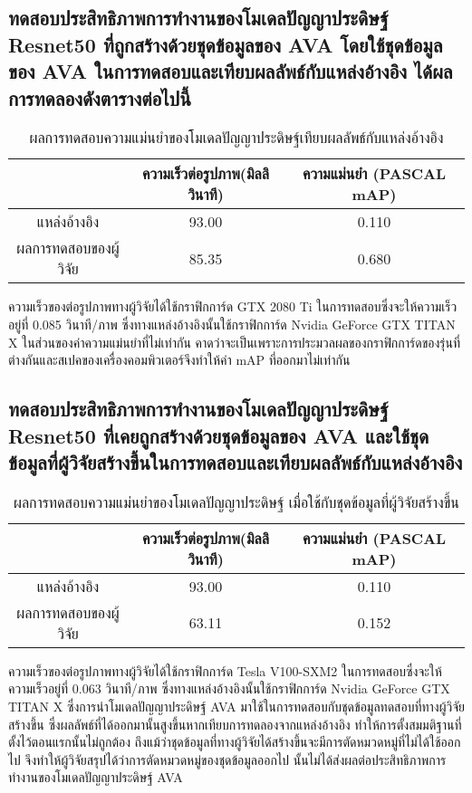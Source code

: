 \subsection{ทดสอบประสิทธิภาพการทำงานของโมเดลปัญญาประดิษฐ์ Resnet50 ที่ถูกสร้างด้วยชุดข้อมูลของ AVA โดยใช้ชุดข้อมูลของ AVA ในการทดสอบและเทียบผลลัพธ์กับแหล่งอ้างอิง ได้ผลการทดลองดังตารางต่อไปนี้}
\begin{table}[!ht]
	\centering
	\begin{tabular}{|c|c|c|}
			\hline
			{}&{ความเร็วต่อรูปภาพ(มิลลิวินาที)}&{ความแม่นยำ (PASCAL mAP)}			\\
			\hline
			แหล่งอ้างอิง	 					& 93.00		& 0.110				\\
			ผลการทดสอบของผู้วิจัย				& 85.35  	& 0.680				\\
			\hline
	\end{tabular}
\caption{ผลการทดสอบความแม่นยำของโมเดลปัญญาประดิษฐ์เทียบผลลัพธ์กับแหล่งอ้างอิง}
\label{tab: Compare PASCAL mAP with source}
\end{table}
ความเร็วของต่อรูปภาพทางผู้วิจัยได้ใช้กราฟิกการ์ด GTX 2080 Ti ในการทดสอบซึ่งจะให้ความเร็วอยู่ที่ 0.085 วินาที/ภาพ ซึ่งทางแหล่งอ้างอิงนั้นใช้กราฟิกการ์ด Nvidia GeForce GTX TITAN X 
ในส่วนของค่าความแม่นยำที่ไม่เท่ากัน คาดว่าจะเป็นเพราะการประมวลผลของกราฟิกการ์ดของรุ่นที่ต่างกันและสเปคของเครื่องคอมพิวเตอร์จึงทำให้ค่า mAP ที่ออกมาไม่เท่ากัน

\subsection{ทดสอบประสิทธิภาพการทำงานของโมเดลปัญญาประดิษฐ์ Resnet50 ที่เคยถูกสร้างด้วยชุดข้อมูลของ AVA และใช้ชุดข้อมูลที่ผู้วิจัยสร้างขึ้นในการทดสอบและเทียบผลลัพธ์กับแหล่งอ้างอิง}
\begin{table}[!ht]
	\centering
	\begin{tabular}{|c|c|c|}
			\hline
			{}&{ความเร็วต่อรูปภาพ(มิลลิวินาที)}&{ความแม่นยำ (PASCAL mAP)}			\\
			\hline
			แหล่งอ้างอิง	 					& 93.00			& 0.110			\\
			ผลการทดสอบของผู้วิจัย				& 63.11			& 0.152			\\
			\hline
	\end{tabular}
\caption{ผลการทดสอบความแม่นยำของโมเดลปัญญาประดิษฐ์ เมื่อใช้กับชุดข้อมูลที่ผู้วิจัยสร้างขึ้น}
\label{tab: Compare PASCAL mAP with dataset created by the researcher}
\end{table}
ความเร็วของต่อรูปภาพทางผู้วิจัยได้ใช้กราฟิกการ์ด Tesla V100-SXM2 ในการทดสอบซึ่งจะให้ความเร็วอยู่ที่ 0.063 วินาที/ภาพ ซึ่งทางแหล่งอ้างอิงนั้นใช้กราฟิกการ์ด Nvidia GeForce GTX TITAN X ซึ่งการนำโมเดลปัญญาประดิษฐ์ AVA มาใช้ในการทดสอบกับชุดข้อมูลทดสอบที่ทางผู้วิจัยสร้างขึ้น ซึ่งผลลัพธ์ที่ได้ออกมานั้นสูงขึ้นหากเทียบการทดลองจากแหล่งอ้างอิง ทำให้การตั้งสมมติฐานที่ตั้งไว้ตอนแรกนั้นไม่ถูกต้อง ถึงแม้ว่าชุดข้อมูลที่ทางผู้วิจัยได้สร้างขึ้นจะมีการตัดหมวดหมู่ที่ไม่ได้ใช้ออกไป จึงทำให้ผู้วิจัยสรุปได้ว่าการตัดหมวดหมู่ของชุดข้อมูลออกไป นั้นไม่ได้ส่งผลต่อประสิทธิภาพการทำงานของโมเดลปัญญาประดิษฐ์ AVA
\clearpage
